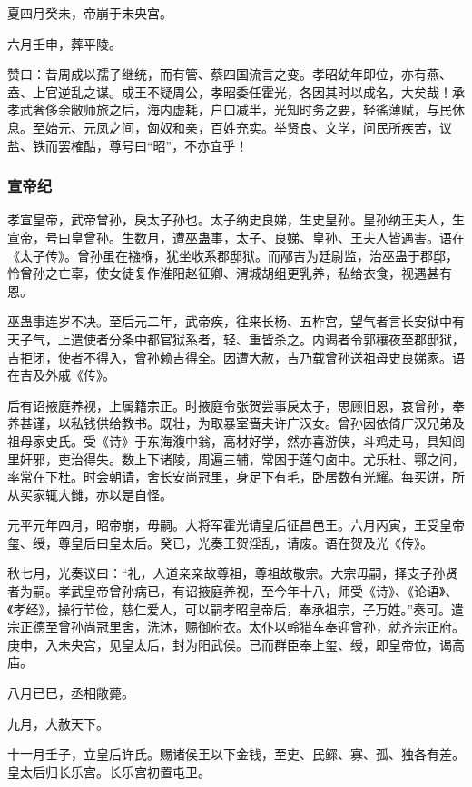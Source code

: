 \documentclass[]{article}
\begin{document}
夏四月癸未，帝崩于未央宫。

六月壬申，葬平陵。

赞曰：昔周成以孺子继统，而有管、蔡四国流言之变。孝昭幼年即位，亦有燕、盍、上官逆乱之谋。成王不疑周公，孝昭委任霍光，各因其时以成名，大矣哉！承孝武奢侈余敝师旅之后，海内虚耗，户口减半，光知时务之要，轻徭薄赋，与民休息。至始元、元凤之间，匈奴和亲，百姓充实。举贤良、文学，问民所疾苦，议盐、铁而罢榷酤，尊号曰``昭''，不亦宜乎！

\hypertarget{header-n730}{%
\subsubsection{宣帝纪}\label{header-n730}}

孝宣皇帝，武帝曾孙，戾太子孙也。太子纳史良娣，生史皇孙。皇孙纳王夫人，生宣帝，号曰皇曾孙。生数月，遭巫蛊事，太子、良娣、皇孙、王夫人皆遇害。语在《太子传》。曾孙虽在襁褓，犹坐收系郡邸狱。而邴吉为廷尉监，治巫蛊于郡邸，怜曾孙之亡辜，使女徒复作淮阳赵征卿、渭城胡组更乳养，私给衣食，视遇甚有恩。

巫蛊事连岁不决。至后元二年，武帝疾，往来长杨、五柞宫，望气者言长安狱中有天子气，上遣使者分条中都官狱系者，轻、重皆杀之。内谒者令郭穰夜至郡邸狱，吉拒闭，使者不得入，曾孙赖吉得全。因遭大赦，吉乃载曾孙送祖母史良娣家。语在吉及外戚《传》。

后有诏掖庭养视，上属籍宗正。时掖庭令张贺尝事戾太子，思顾旧恩，哀曾孙，奉养甚谨，以私钱供给教书。既壮，为取暴室啬夫许广汉女。曾孙因依倚广汉兄弟及祖母家史氏。受《诗》于东海澓中翁，高材好学，然亦喜游侠，斗鸡走马，具知闾里奸邪，吏治得失。数上下诸陵，周遍三辅，常困于莲勺卤中。尤乐杜、鄠之间，率常在下杜。时会朝请，舍长安尚冠里，身足下有毛，卧居数有光耀。每买饼，所从买家辄大雠，亦以是自怪。

元平元年四月，昭帝崩，毋嗣。大将军霍光请皇后征昌邑王。六月丙寅，王受皇帝玺、绶，尊皇后曰皇太后。癸已，光奏王贺淫乱，请废。语在贺及光《传》。

秋七月，光奏议曰：``礼，人道亲亲故尊祖，尊祖故敬宗。大宗毋嗣，择支子孙贤者为嗣。孝武皇帝曾孙病已，有诏掖庭养视，至今年十八，师受《诗》、《论语》、《孝经》，操行节俭，慈仁爱人，可以嗣孝昭皇帝后，奉承祖宗，子万姓。''奏可。遣宗正德至曾孙尚冠里舍，洗沐，赐御府衣。太仆以軨猎车奉迎曾孙，就齐宗正府。庚申，入未央宫，见皇太后，封为阳武侯。已而群臣奉上玺、绶，即皇帝位，谒高庙。

八月已巳，丞相敞薨。

九月，大赦天下。

十一月壬子，立皇后许氏。赐诸侯王以下金钱，至吏、民鳏、寡、孤、独各有差。皇太后归长乐宫。长乐宫初置屯卫。
\end{document}

